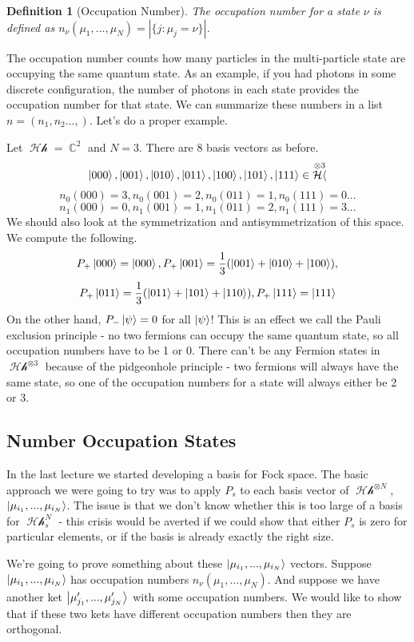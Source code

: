 \documentclass{article}
\DeclareMathOperator{\Hh}{\mathcal{Hh}}
\DeclareMathOperator{\CC}{\mathbb{C}}
\newtheorem{defn}{Definition}
\begin{document}
\begin{defn}[Occupation Number] The occupation number for a state $\nu$ is defined as $n_\nu(\mu_1,...,\mu_N) = |\{j:\mu_j=\nu\}|$.\end{defn} 

The occupation number counts how many particles in the multi-particle state are occupying the same quantum state. As an example, if you had photons in some discrete configuration, the number of photons in each state provides the occupation number for that state. We can summarize these numbers in a list $n = (n_1,n_2...,)$. Let's do a proper example.

Let $\Hh = \CC^2$ and $N = 3$. There are 8 basis vectors as before. 
\[\ket{000},\ket{001},\ket{010},\ket{011},\ket{100},\ket{101},\ket{111}\in \Hh^{\otimes 3}\]
\[n_0(000)=3, n_0 (001)=2, n_0(011) = 1, n_0 (111)=0 ...\]
\[n_1(000)=0, n_1(001) = 1, n_1(011) = 2, n_1(111) = 3 ...\]
We should also look at the symmetrization and antisymmetrization of this space. We compute the following.
\[P_+\ket{000}=\ket{000}, P_+\ket{001}=\frac{1}{3}(\ket{001}+\ket{010}+\ket{100}), \]\[P_+\ket{011}=\frac{1}{3}(\ket{011}+\ket{101}+\ket{110}), P_+\ket{111}=\ket{111} \]
On the other hand, $P_-\ket{\psi}=0$ for all $\ket{\psi}$! This is an effect we call the Pauli exclusion principle - no two fermions can occupy the same quantum state, so all occupation numbers have to be 1 or 0. There can't be any Fermion states in $\Hh^{\otimes 3}$ because of the pidgeonhole principle - two fermions will always have the same state, so one of the occupation numbers for a state will always either be 2 or 3.

\subsection{Number Occupation States}
In the last lecture we started developing a basis for Fock space. The basic approach we were going to try was to apply $P_s$ to each basis vector of $\Hh^{\otimes N}$, $\ket{\mu_{i_1},...,\mu_{i_N}}$. The issue is that we don't know whether this is too large of a basis for $\Hh_s^N$ - this crisis would be averted if we could show that either $P_s$ is zero for particular elements, or if the basis is already exactly the right size. 

We're going to prove something about these $\ket{\mu_{i_1},...,\mu_{i_N}}$ vectors. Suppose $\ket{\mu_{i_1},...,\mu_{i_N}}$ has occupation numbers $n_\nu(\mu_1,...,\mu_N)$. And suppose we have another ket $\ket{\mu'_{j_1},...,\mu'_{j_N}}$ with some occupation numbers. We would like to show that if these two kets have different occupation numbers then they are orthogonal.
\end{document}
